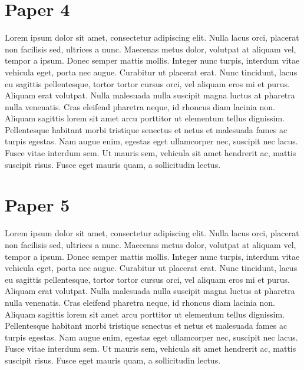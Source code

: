 \documentclass[12pt,a4paper,titlepage]{report}
\begin{document}
\section{Paper 4}
Lorem ipsum dolor sit amet, consectetur adipiscing elit. Nulla lacus orci, placerat non facilisis sed, ultrices a nunc. Maecenas metus dolor, volutpat at aliquam vel, tempor a ipsum. Donec semper mattis mollis. Integer nunc turpis, interdum vitae vehicula eget, porta nec augue. Curabitur ut placerat erat. Nunc tincidunt, lacus eu sagittis pellentesque, tortor tortor cursus orci, vel aliquam eros mi et purus. Aliquam erat volutpat. Nulla malesuada nulla suscipit magna luctus at pharetra nulla venenatis. Cras eleifend pharetra neque, id rhoncus diam lacinia non. Aliquam sagittis lorem sit amet arcu porttitor ut elementum tellus dignissim. Pellentesque habitant morbi tristique senectus et netus et malesuada fames ac turpis egestas. Nam augue enim, egestas eget ullamcorper nec, suscipit nec lacus. Fusce vitae interdum sem. Ut mauris sem, vehicula sit amet hendrerit ac, mattis suscipit risus. Fusce eget mauris quam, a sollicitudin lectus.

\section{Paper 5}
Lorem ipsum dolor sit amet, consectetur adipiscing elit. Nulla lacus orci, placerat non facilisis sed, ultrices a nunc. Maecenas metus dolor, volutpat at aliquam vel, tempor a ipsum. Donec semper mattis mollis. Integer nunc turpis, interdum vitae vehicula eget, porta nec augue. Curabitur ut placerat erat. Nunc tincidunt, lacus eu sagittis pellentesque, tortor tortor cursus orci, vel aliquam eros mi et purus. Aliquam erat volutpat. Nulla malesuada nulla suscipit magna luctus at pharetra nulla venenatis. Cras eleifend pharetra neque, id rhoncus diam lacinia non. Aliquam sagittis lorem sit amet arcu porttitor ut elementum tellus dignissim. Pellentesque habitant morbi tristique senectus et netus et malesuada fames ac turpis egestas. Nam augue enim, egestas eget ullamcorper nec, suscipit nec lacus. Fusce vitae interdum sem. Ut mauris sem, vehicula sit amet hendrerit ac, mattis suscipit risus. Fusce eget mauris quam, a sollicitudin lectus.

\end{document}
